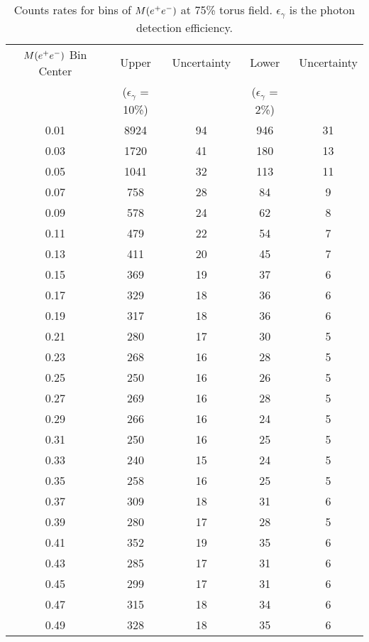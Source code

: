 \begin{table}[h!]
\begin{minipage}{\textwidth}
\begin{center}

\caption[Expected count rates]{\label{tab:counts}Counts rates for bins of $M(e^+e^-)$ at 75\% torus field. $\epsilon_\gamma$ is the photon detection efficiency.\vspace{0.75mm}}

\begin{tabular}{c|c|c|c|c}

\hline
$M(e^+e^-)$ Bin Center & Upper & Uncertainty & Lower  & Uncertainty \\
& ($\epsilon_\gamma$ = 10\%) &   &($\epsilon_\gamma$ = 2\%)& \\
\hline
0.01  & 8924  & 94  & 946  & 31\\
0.03  & 1720  & 41  & 180  & 13\\
0.05  & 1041  & 32  & 113  & 11\\
0.07  & 758  & 28  & 84  & 9\\
0.09  & 578  & 24  & 62  & 8\\
0.11  & 479  & 22  & 54  & 7\\
0.13  & 411  & 20  & 45  & 7\\
0.15  & 369  & 19  & 37  & 6\\
0.17  & 329  & 18  & 36  & 6\\
0.19  & 317  & 18  & 36  & 6\\
0.21  & 280  & 17  & 30  & 5\\
0.23  & 268  & 16  & 28  & 5\\
0.25  & 250  & 16  & 26  & 5\\
0.27  & 269  & 16  & 28  & 5\\
0.29  & 266  & 16  & 24  & 5\\
0.31  & 250  & 16  & 25  & 5\\
0.33  & 240  & 15  & 24  & 5\\
0.35  & 258  & 16  & 25  & 5\\
0.37  & 309  & 18  & 31  & 6\\
0.39  & 280  & 17  & 28  & 5\\
0.41  & 352  & 19  & 35  & 6\\
0.43  & 285  & 17  & 31  & 6\\
0.45  & 299  & 17  & 31  & 6\\
0.47  & 315  & 18  & 34  & 6\\
0.49  & 328  & 18  & 35  & 6\\

\end{tabular}
\end{center}
\end{minipage}
\end{table}
